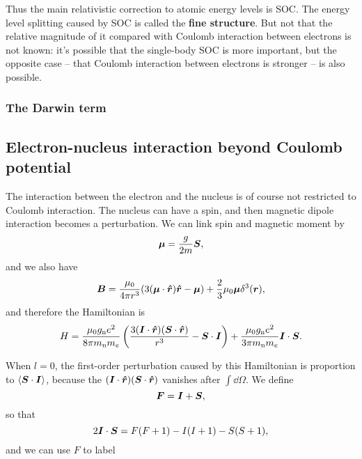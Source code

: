 \documentclass[hyperref, a4paper]{article}
\newcommand*{\concept}[1]{{\textbf{#1}}}
\begin{document}
Thus the main relativistic correction to atomic energy levels is SOC. 
The energy level splitting caused by SOC 
is called the \concept{fine structure}.
But not that the relative magnitude of it compared 
with Coulomb interaction between electrons 
is not known:
it's possible that the single-body SOC is more important,
but the opposite case -- that Coulomb interaction between electrons is stronger 
-- is also possible.

\subsubsection{The Darwin term}



\subsection{Electron-nucleus interaction beyond Coulomb potential}

The interaction between the electron and the nucleus 
is of course not restricted to Coulomb interaction.
The nucleus can have a spin, 
and then magnetic dipole interaction becomes a perturbation.
We can link spin and magnetic moment by 
\begin{equation}
    \vb*{\mu} = \frac{g}{2m} \vb*{S},
\end{equation}
and we also have 
\begin{equation}
    \vb*{B} = \frac{\mu_0}{4 \pi r^3} (3 (\vb*{\mu} \cdot \vu*{r}) \vu*{r} - \vb*{\mu})
    + \frac{2}{3} \mu_0 \vb*{\mu} \delta^3(\vb*{r}),
\end{equation}
and therefore the Hamiltonian is 
\begin{equation}
    H = \frac{\mu_0 g_{\text{n}} e^2}{8 \pi m_{\text{n}} m_e} 
    \left(
        \frac{3 (\vb*{I} \cdot \vu*{r}) (\vb*{S} \cdot \vu*{r})}{r^3}
        - \vb*{S} \cdot \vb*{I}
    \right)
    + \frac{\mu_0 g_{\text{n}} e^2}{3 \pi m_{\text{n}} m_e} \vb*{I} \cdot \vb*{S}.
\end{equation}

When $l = 0$, the first-order perturbation caused by this Hamiltonian 
is proportion to $\expval{\vb*{S} \cdot \vb*{I}}$,
because the $(\vb*{I} \cdot \vu*{r}) (\vb*{S} \cdot \vu*{r})$
vanishes after $\int \dd{\Omega}$.
We define 
\begin{equation}
    \vb*{F} = \vb*{I} + \vb*{S},
\end{equation}
so that 
\begin{equation}
    2 \vb*{I} \cdot \vb*{S} = F(F+1) - I(I+1) - S(S+1),
\end{equation}
and we can use $F$ to label 
\end{document}
